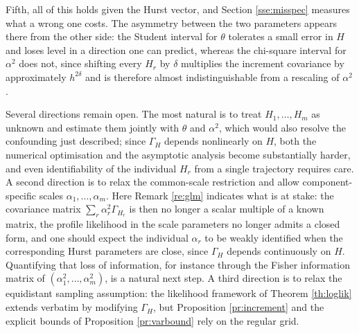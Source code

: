 \documentclass[11pt,reqno]{amsart}
\numberwithin{equation}{section}
\theoremstyle{plain}
\theoremstyle{definition}
\theoremstyle{remark}
\newcommand{\GH}{\Gamma_H}
\begin{document}
Fifth, all of this holds given the Hurst vector, and Section \ref{sse:misspec} measures
what a wrong one costs. The asymmetry between the two parameters appears there from the
other side: the Student interval for $\theta$ tolerates a small error in $H$ and loses
level in a direction one can predict, whereas the chi-square interval for $\alpha^{2}$
does not, since shifting every $H_r$ by $\delta$ multiplies the increment covariance by
approximately $h^{2\delta}$ and is therefore almost indistinguishable from a rescaling of
$\alpha^{2}$.

Several directions remain open. The most natural is to treat $H_1,\dots,H_m$ as unknown
and estimate them jointly with $\theta$ and $\alpha^{2}$, which would also resolve the
confounding just described; since $\GH$ depends nonlinearly on $H$, both the numerical
optimisation and the asymptotic analysis become substantially harder, and even
identifiability of the individual $H_r$ from a single trajectory requires care. A second
direction is to relax the common-scale restriction and allow component-specific scales
$\alpha_1,\dots,\alpha_m$. Here Remark \ref{re:glm} indicates what is at stake: the
covariance matrix $\sum_r\alpha_r^{2}\Gamma_{H_r}$ is then no longer a scalar multiple of
a known matrix, the profile likelihood in the scale parameters no longer admits a closed
form, and one should expect the individual $\alpha_r$ to be weakly identified when the
corresponding Hurst parameters are close, since $\Gamma_{H}$ depends continuously on $H$.
Quantifying that loss of information, for instance through the Fisher information matrix
of $(\alpha_1^{2},\dots,\alpha_m^{2})$, is a natural next step. A third direction is to
relax the equidistant sampling assumption: the likelihood framework of
Theorem \ref{th:loglik} extends verbatim by modifying $\GH$, but
Proposition \ref{pr:increment} and the explicit bounds of Proposition \ref{pr:varbound}
rely on the regular grid.
\end{document}
